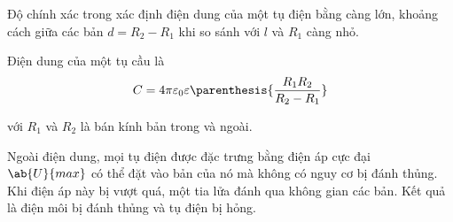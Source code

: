 Độ chính xác trong xác định điện dung của một tụ điện bằng  càng lớn, khoảng cách giữa các bản $d=R_2-R_1$ khi so sánh với $l$ và $R_1$ càng nhỏ.

Điện dung của một tụ cầu là
\begin{equation}\label{eq:3_14}
    C = 4\pi\varepsilon_0\varepsilon \parenthesis{\frac{R_1 R_2}{R_2 - R_1}}
\end{equation}

\noindent
với $R_1$ và $R_2$ là bán kính bản trong và ngoài.

Ngoài điện dung, mọi tụ điện được đặc trưng bằng điện áp cực đại $\ab{U}{max}$ có thể đặt vào bản của nó mà không có nguy cơ bị đánh thủng. Khi điện áp này bị vượt quá, một tia lửa đánh qua không gian các bản. Kết quả là điện môi bị đánh thủng và tụ điện bị hỏng.
